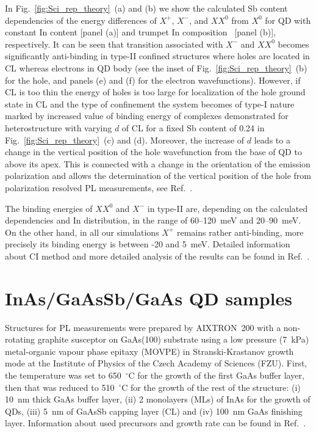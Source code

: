 In Fig.~\ref{fig:Sci_rep_theory}~(a) and (b) we show the calculated Sb content dependencies of the energy differences of $X^+$, $X^-$, and $XX^0$ from $X^0$ for QD with constant In content [panel (a)] and trumpet In composition~\cite{Migliorato} [panel (b)], respectively. It can be seen that transition associated with $X^-$ and $XX^0$ becomes significantly anti-binding in type-II confined structures where holes are located in CL whereas electrons in QD body (see the inset of Fig.~\ref{fig:Sci_rep_theory}~(b) for the hole, and panels (e) and (f) for the electron wavefunctions). However, if CL is too thin the energy of holes is too large for localization of the hole ground state in CL and the type of confinement the system becomes of type-I nature marked by increased value of binding energy of complexes demonstrated for heterostructure with varying $d$ of CL for a fixed Sb content of 0.24 in Fig.~\ref{fig:Sci_rep_theory}~(c) and (d). Moreover, the increase of $d$ leads to a change in the vertical position of the hole wavefunction from the base of QD to above its apex. This is connected with a change in the orientation of the emission polarization and allows the determination of the vertical position of the hole from polarization resolved PL measurements, see Ref.~\citep{Klenovsky2016}. 

The binding energies of $XX^0$ and $X^-$ in type-II are, depending on the calculated dependencies and In distribution, in the range of 60--120~meV and 20--90~meV. On the other hand, in all our simulations $X^+$ remains rather anti-binding, more precisely its binding energy is between -20 and 5~meV. Detailed information about CI method and more detailed analysis of the results can be found in Ref.~\citep{Klenovsky2017}.


\section{InAs/GaAsSb/GaAs QD samples}

Structures for PL measurements were prepared by AIXTRON~200 with a non-rotating graphite susceptor on GaAs(100) substrate using a low pressure (7~kPa) metal-organic vapour phase epitaxy (MOVPE) in Stranski-Krastanov growth mode at the Institute of Physics of the Czech Academy of Sciences (FZU). First, the temperature was set to 650~$^\circ$C for the growth of the first GaAs buffer layer, then that was reduced to 510~$^\circ$C for the growth of the rest of the structure: (i) 10~nm thick GaAs buffer layer, (ii) 2 monolayers (MLs) of InAs for the growth of QDs, (iii) 5~nm of GaAsSb capping layer (CL) and (iv) 100~nm GaAs finishing layer. Information about used precursors and growth rate can be found in Ref.~\citep{Klenovsky2016}.

